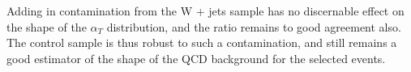 Adding in contamination from the W + jets sample has no discernable effect on the shape of the $\alpha_{T}$ distribution, and the ratio remains to good agreement also. The control sample is thus robust to such a contamination, and still remains a good estimator of the shape of the QCD background for the selected events.

